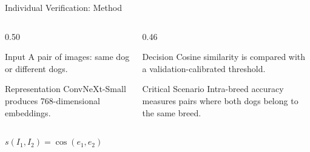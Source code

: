 \documentclass[aspectratio=169,11pt]{beamer}
\begin{document}
\begin{frame}{Individual Verification: Method}
  \begin{columns}[T,onlytextwidth]
    \begin{column}{0.50\textwidth}
      \begin{block}{Input}
        A pair of images: same dog or different dogs.
      \end{block}
      \begin{block}{Representation}
        ConvNeXt-Small produces 768-dimensional embeddings.
      \end{block}
    \end{column}
    \begin{column}{0.46\textwidth}
      \begin{block}{Decision}
        Cosine similarity is compared with a validation-calibrated threshold.
      \end{block}
      \begin{alertblock}{Critical Scenario}
        Intra-breed accuracy measures pairs where both dogs belong to the same breed.
      \end{alertblock}
    \end{column}
  \end{columns}
  \vspace{0.2cm}
  \begin{center}
    \Large $s(I_1,I_2)=\cos(e_1,e_2)$
  \end{center}
\end{frame}
\end{document}
